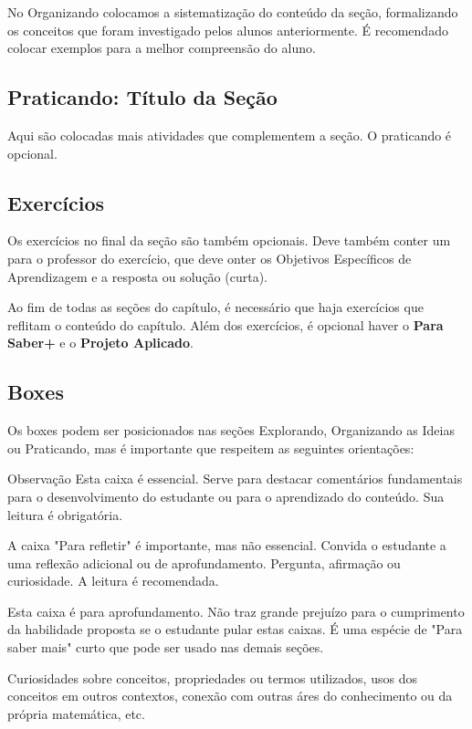 No Organizando colocamos a sistematização do conteúdo da seção, formalizando os conceitos que foram investigado pelos alunos anteriormente. É recomendado colocar exemplos para a melhor compreensão do aluno.

\def\currentcolor{session2}
\subsection{Praticando: Título da Seção}

Aqui são colocadas mais atividades que complementem a seção. O praticando é opcional.

\def\currentcolor{primario}
\subsection{Exercícios}

Os exercícios no final da seção são também opcionais. Deve também conter um para o professor do exercício, que deve onter os Objetivos Específicos de Aprendizagem e a resposta ou solução (curta).


Ao fim de todas as seções do capítulo, é necessário que haja exercícios que reflitam o conteúdo do capítulo. Além dos exercícios, é opcional haver o \textcolor{session3}{\textbf{Para Saber+}} e o \textcolor{cor2}{\textbf{Projeto Aplicado}}.

\def\currentcolor{session3}
\subsection{Boxes}

Os boxes podem ser posicionados nas seções Explorando, Organizando as Ideias ou Praticando, mas é importante que respeitem as seguintes orientações:

\begin{observationtitle}{Observação}
Esta caixa é essencial. Serve para destacar comentários fundamentais para o desenvolvimento do estudante ou para o aprendizado do conteúdo. Sua leitura é obrigatória.
\end{observationtitle}
\clearpage
\begin{reflection}
A caixa "Para refletir"{} é importante, mas não essencial. Convida o estudante a uma reflexão adicional ou de aprofundamento. Pergunta, afirmação ou curiosidade. A leitura é recomendada.
\end{reflection}

\begin{knowledge}
Esta caixa é para aprofundamento. Não traz grande prejuízo para o cumprimento da habilidade proposta se o estudante pular estas caixas. É uma espécie de "Para saber mais"{ curto que pode ser usado nas demais seções}.

Curiosidades sobre conceitos, propriedades ou termos utilizados, usos dos conceitos em outros contextos, conexão com outras áres do conhecimento ou da própria matemática, etc.
\end{knowledge}


\ifnum{}
\clearpage
\else
\notasfinais
\fi